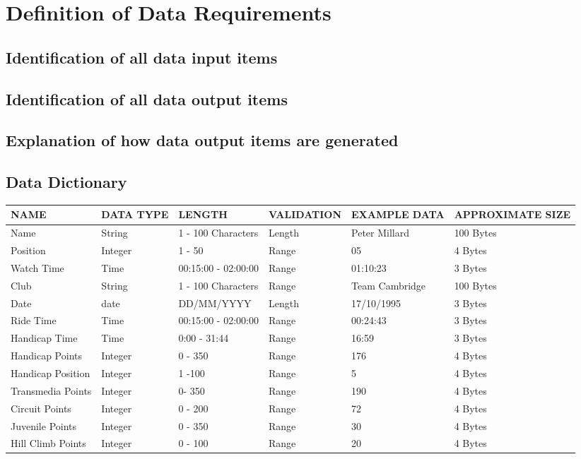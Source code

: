 \section{Definition of Data Requirements}

\subsection{Identification of all data input items}

\subsection{Identification of all data output items}

\subsection{Explanation of how data output items are generated}

\subsection{Data Dictionary}

\begin{tabular}{|p{1.5cm}|p{1.5cm}|l|l|l|p{2.5cm}|}
	\hline
	NAME & DATA TYPE & LENGTH & VALIDATION & EXAMPLE DATA & APPROXIMATE SIZE \\ \hline
	Name & String & 1 - 100 Characters & Length & Peter Millard & 100 Bytes \\ \hline
	Position & Integer & 1 - 50 & Range & 05 & 4 Bytes \\ \hline
	Watch Time & Time & 00:15:00 - 02:00:00 & Range & 01:10:23 & 3 Bytes \\ \hline
	Club & String & 1 - 100 Characters & Range & Team Cambridge &  100 Bytes\\ \hline
	Date & date & DD/MM/YYYY & Length & 17/10/1995 & 3 Bytes \\ \hline
	Ride Time & Time & 00:15:00 - 02:00:00 & Range & 00:24:43 & 3 Bytes \\ \hline
	Handicap Time & Time & 0:00 - 31:44 & Range & 16:59 & 3 Bytes \\ \hline
	Handicap Points & Integer & 0 - 350 & Range & 176 & 4 Bytes \\ \hline
	Handicap Position & Integer & 1 -100 & Range & 5 & 4 Bytes \\ \hline
	Transmedia Points & Integer & 0- 350 & Range & 190& 4 Bytes \\ \hline
	Circuit Points & Integer & 0 - 200 & Range & 72 & 4 Bytes \\ \hline	
	Juvenile Points & Integer & 0 - 350 & Range & 30 & 4 Bytes \\ \hline
	Hill Climb Points & Integer & 0 - 100 & Range & 20 &  4 Bytes\\ \hline
\end{tabular}


